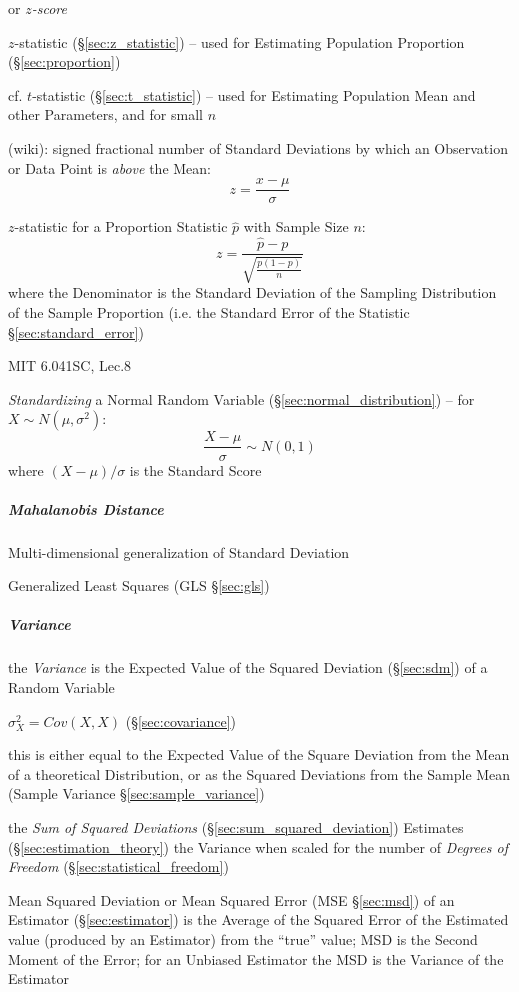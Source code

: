 or \emph{$z$-score}

$z$-statistic (\S\ref{sec:z_statistic}) -- used for Estimating Population
Proportion (\S\ref{sec:proportion})

cf. $t$-statistic (\S\ref{sec:t_statistic}) -- used for Estimating Population
Mean and other Parameters, and for small $n$

(wiki): signed fractional number of Standard Deviations by which an Observation
or Data Point is \emph{above} the Mean:
\[
  z = \frac{x - \mu}{\sigma}
\]

$z$-statistic for a Proportion Statistic $\hat{p}$ with Sample Size $n$:
\[
  z = \frac{\hat{p} - p}{\sqrt{\frac{p(1-p)}{n}}}
\]
where the Denominator is the Standard Deviation of the Sampling Distribution of
the Sample Proportion (i.e. the Standard Error of the Statistic
\S\ref{sec:standard_error})

MIT 6.041SC, Lec.8

\emph{Standardizing} a Normal Random Variable (\S\ref{sec:normal_distribution})
-- for $X \sim N(\mu, \sigma^2)$:
\[
  \frac{X - \mu}{\sigma} \sim N(0, 1)
\]
where $(X - \mu)/\sigma$ is the Standard Score



\subparagraph{Mahalanobis Distance}\label{sec:mahalanobis_distance}\hfill

Multi-dimensional generalization of Standard Deviation

Generalized Least Squares (GLS \S\ref{sec:gls})



\subparagraph{Variance}\label{sec:variance}\hfill

the \emph{Variance} is the Expected Value of the Squared Deviation
(\S\ref{sec:sdm}) of a Random Variable

$\sigma_X^2 = Cov(X,X)$ (\S\ref{sec:covariance})

this is either equal to the Expected Value of the Square Deviation from the
Mean of a theoretical Distribution, or as the Squared Deviations from the Sample
Mean (Sample Variance \S\ref{sec:sample_variance})

the \emph{Sum of Squared Deviations} (\S\ref{sec:sum_squared_deviation})
Estimates (\S\ref{sec:estimation_theory}) the Variance when scaled for the
number of \emph{Degrees of Freedom} (\S\ref{sec:statistical_freedom})

\fist Mean Squared Deviation or Mean Squared Error (MSE \S\ref{sec:msd}) of an
Estimator (\S\ref{sec:estimator}) is the Average of the Squared Error of the
Estimated value (produced by an Estimator) from the ``true'' value; MSD is
the Second Moment of the Error; for an Unbiased Estimator the MSD is the
Variance of the Estimator


